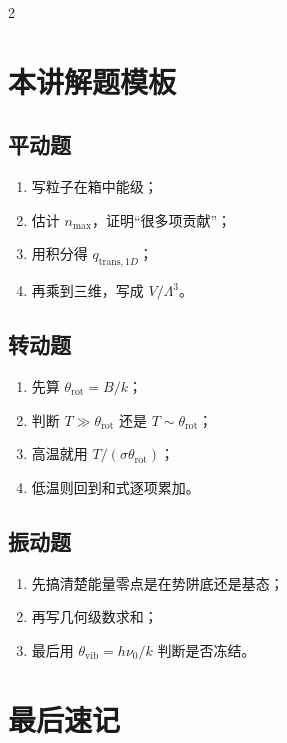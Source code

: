 \documentclass[a4paper,9pt]{article}
\begin{document}
\begin{multicols}{2}
	\section{本讲解题模板}

	\subsection{平动题}
	\begin{enumerate}
		\item 写粒子在箱中能级；
		\item 估计 $n_{\max}$，证明“很多项贡献”；
		\item 用积分得 $q_{\mathrm{trans},1D}$；
		\item 再乘到三维，写成 $V/\Lambda^3$。
	\end{enumerate}

	\subsection{转动题}
	\begin{enumerate}
		\item 先算 $\theta_{\mathrm{rot}}=B/k$；
		\item 判断 $T\gg\theta_{\mathrm{rot}}$ 还是 $T\sim\theta_{\mathrm{rot}}$；
		\item 高温就用 $T/(\sigma\theta_{\mathrm{rot}})$；
		\item 低温则回到和式逐项累加。
	\end{enumerate}

	\subsection{振动题}
	\begin{enumerate}
		\item 先搞清楚能量零点是在势阱底还是基态；
		\item 再写几何级数求和；
		\item 最后用 $\theta_{\mathrm{vib}}=h\nu_0/k$ 判断是否冻结。
	\end{enumerate}

	\section{最后速记}


\end{multicols}
\end{document}
